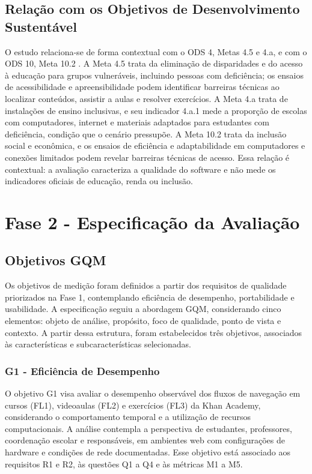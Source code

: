 \documentclass[sigconf, language=english, language=brazilian,natbib=false]{acmart}
\begin{document}
\subsection{Relação com os Objetivos de Desenvolvimento Sustentável}

O estudo relaciona-se de forma contextual com o ODS 4, Metas 4.5 e 4.a, e com o ODS 10, Meta 10.2 \cite{un_sdg4_5,un_sdg4_a,un_sdg10_2}. A Meta 4.5 trata da eliminação de disparidades e do acesso à educação para grupos vulneráveis, incluindo pessoas com deficiência; os ensaios de acessibilidade e apreensibilidade podem identificar barreiras técnicas ao localizar conteúdos, assistir a aulas e resolver exercícios. A Meta 4.a trata de instalações de ensino inclusivas, e seu indicador 4.a.1 mede a proporção de escolas com computadores, internet e materiais adaptados para estudantes com deficiência, condição que o cenário pressupõe. A Meta 10.2 trata da inclusão social e econômica, e os ensaios de eficiência e adaptabilidade em computadores e conexões limitados podem revelar barreiras técnicas de acesso. Essa relação é contextual: a avaliação caracteriza a qualidade do software e não mede os indicadores oficiais de educação, renda ou inclusão.

\section{Fase 2 - Especificação da Avaliação}

\subsection{Objetivos GQM}

Os objetivos de medição foram definidos a partir dos requisitos de qualidade priorizados na Fase 1, contemplando eficiência de desempenho, portabilidade e usabilidade. A especificação seguiu a abordagem GQM, considerando cinco elementos: objeto de análise, propósito, foco de qualidade, ponto de vista e contexto. A partir dessa estrutura, foram estabelecidos três objetivos, associados às características e subcaracterísticas selecionadas.

\subsubsection{G1 - Eficiência de Desempenho}

O objetivo G1 visa avaliar o desempenho observável dos fluxos
de navegação em cursos (FL1), videoaulas (FL2) e exercícios (FL3) da
Khan Academy, considerando o comportamento temporal e a
utilização de recursos computacionais. A análise contempla
a perspectiva de estudantes, professores, coordenação
escolar e responsáveis, em ambientes web com configurações
de hardware e condições de rede documentadas. Esse objetivo
está associado aos requisitos R1 e R2, às questões Q1 a Q4
e às métricas M1 a M5.
\end{document}
